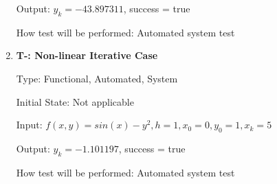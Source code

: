 \documentclass[12pt, titlepage]{article}
\newcounter{tnum} %
\begin{document}
\begin{enumerate}
Output: $y_k = -43.897311$, success = true
					
How test will be performed: Automated system test

\item{\textbf{T-\thetnum \label{t-heun_nonlineariterative}: Non-linear Iterative Case}}

Type: Functional, Automated, System %
					
Initial State: Not applicable
					
Input: $f(x, y) = sin(x) - y^2, h = 1, x_0 = 0, y_0 = 1, x_k = 5$
					
Output: $y_k = -1.101197$, success = true
					
How test will be performed: Automated system test

\end{enumerate}
\end{document}
